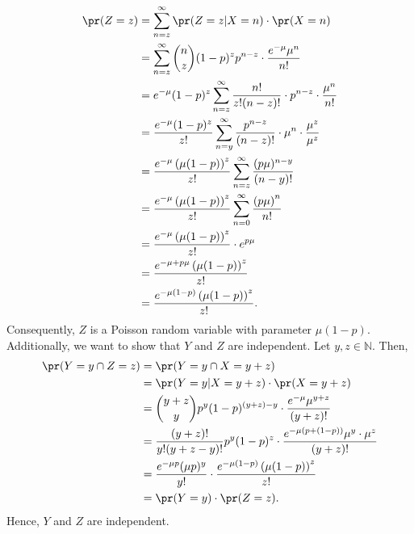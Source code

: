 \begin{align*}
  \pr(Z = z)
    &= \sum_{n = z}^{\infty} \pr(Z = z | X = n) \cdot \pr(X = n) \\
    &= \sum_{n = z}^{\infty} \binom{n}{z} (1-p)^z p^{n-z} \cdot \frac{e^{-\mu}\mu^n}{n!} \\
    &= e^{-\mu} (1-p)^z \sum_{n = z}^{\infty} \frac{n!}{z!(n-z)!} \cdot p^{n-z} \cdot \frac{\mu^n}{n!} \\
    &= \frac{e^{-\mu} (1-p)^z}{z!} \sum_{n = y}^{\infty} \frac{p^{n-z}}{(n-z)!} \cdot \mu^n \cdot \frac{\mu^z}{\mu^z} \\
    &= \frac{e^{-\mu} \left(\mu(1-p)\right)^z}{z!} \sum_{n = z}^{\infty} \frac{(p\mu)^{n-y}}{(n-y)!} \\
    &= \frac{e^{-\mu} \left(\mu(1-p)\right)^z}{z!} \sum_{n = 0}^{\infty} \frac{\left(p\mu\right)^{n}}{n!} \\
    &= \frac{e^{-\mu} \left(\mu(1-p)\right)^z}{z!} \cdot e^{p\mu} \\
    &= \frac{e^{-\mu + p\mu} \left(\mu(1-p)\right)^z}{z!} \\
    &= \frac{e^{-\mu(1-p)} \left(\mu(1-p)\right)^z}{z!}. \\
\end{align*}
Consequently, $Z$ is a Poisson random variable with parameter $\mu (1-p)$. \\
Additionally, we want to show that $Y$ and $Z$ are independent. Let $y,z \in \mathbb{N}$.
Then,
\begin{align*}
  \pr(Y = y \cap Z = z)
    &= \pr(Y = y \cap X = y + z) \\
    &= \pr(Y = y | X = y + z) \cdot \pr(X = y + z) \\
    &= \binom{y+z}{y} p^y (1-p)^{(y+z)-y} \cdot \frac{e^{-\mu}\mu^{y+z}}{(y+z)!} \\
    &= \frac{(y+z)!}{y!(y+z-y)!} p^y (1-p)^z \cdot \frac{e^{-\mu(p + (1-p))}\mu^y \cdot \mu^z}{(y+z)!} \\
    &= \frac{e^{-\mu p}(\mu p)^y}{y!} \cdot \frac{e^{-\mu(1-p)} \left(\mu (1-p)\right)^z}{z!} \\
    &= \pr(Y = y) \cdot \pr(Z = z).
\end{align*}
Hence, $Y$ and $Z$ are independent.
